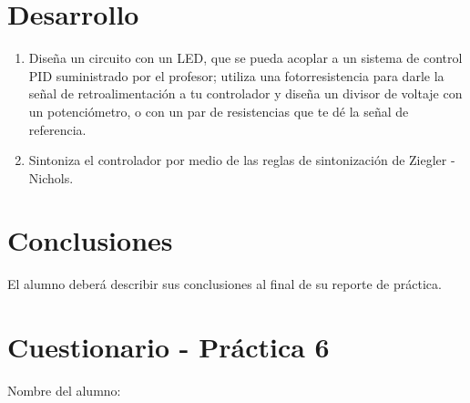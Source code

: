 
\section{Desarrollo}

	\begin{enumerate}
		\item Diseña un circuito con un LED, que se pueda acoplar a un sistema de control PID suministrado por el profesor; utiliza una fotorresistencia para darle la señal de retroalimentación a tu controlador y diseña un divisor de voltaje con un potenciómetro, o con un par de resistencias que te dé la señal de referencia.
		\item Sintoniza el controlador por medio de las reglas de sintonización de Ziegler - Nichols.
	\end{enumerate}


\section{Conclusiones}

	El alumno deberá describir sus conclusiones al final de su reporte de práctica.


\clearpage
\section{Cuestionario - Práctica 6}
	Nombre del alumno: \\[0.2cm]
	\horrule{0.5pt} \\[0.2cm] %

